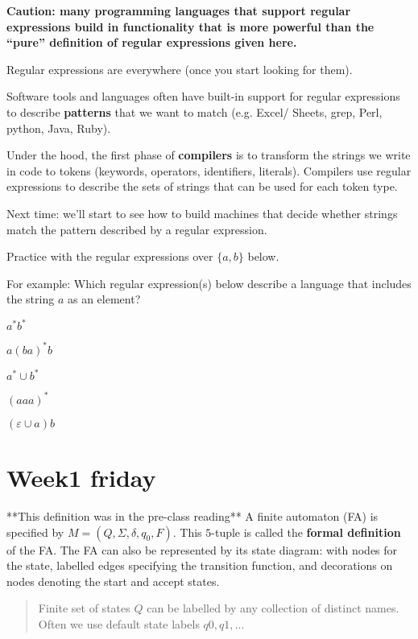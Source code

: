 \documentclass[12pt, oneside]{article}
\begin{document}
\vfill 

{\bf Caution: many programming languages that support regular expressions build in functionality
that is more powerful than the ``pure'' definition of regular expressions given here. }

Regular expressions are everywhere (once you start looking for them).

Software tools and languages often have built-in support for regular expressions to describe
{\bf patterns} that we want to match (e.g. Excel/ Sheets, grep, Perl, python, Java, Ruby).

Under the hood, the first phase of {\bf compilers} is to transform the strings we write 
in code to tokens (keywords, operators, identifiers, literals). Compilers use regular expressions
to describe the sets of strings that can be used for each token type.

Next time: we'll start to see how to build machines that decide whether strings match the pattern
described by a regular expression.

\newpage

Practice with the regular expressions over $\{a,b\}$ below.

For example: Which regular expression(s) below describe a language that includes the string $a$ as an element?

$a^* b^*$ 

\vfill

$a(ba)^* b$

\vfill

$a^* \cup b^*$

\vfill

$(aaa)^*$

\vfill

$(\varepsilon \cup a) b$

\vfill \vfill
\section*{Week1 friday}



**This definition was in the pre-class reading**
A finite automaton (FA) is specified by  $M = (Q, \Sigma, \delta, q_0, F)$.
This $5$-tuple is called the {\bf formal definition} of the FA. The FA can also 
be represented by its state diagram: with nodes for the state, labelled edges specifying the 
transition function, and decorations on nodes denoting the start and accept states.

\begin{quote}
Finite set of states $Q$ can be labelled by any collection of distinct names. Often
we use default state labels $q0, q1, \ldots$ 
\end{quote}
\end{document}
